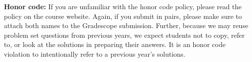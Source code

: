 {\bf Honor code:} 
If you are unfamiliar with the honor code policy, please read the policy on the course website.
Again, if you submit in pairs, please make sure to attach both names to the Gradescope submission.
Further, because we may reuse problem set questions from previous years, we expect students not to copy, refer to, or look at the solutions in preparing their answers. It is an honor code violation to intentionally refer to a previous year's solutions.
